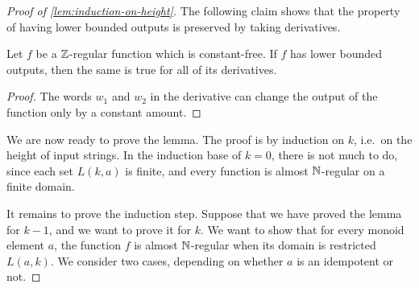 \begin{proof}[Proof of \cref{lem:induction-on-height}]
The following claim shows that the property of having lower bounded outputs is preserved by taking derivatives.

\begin{claim}\label{claim:derivative-lower-bounded}
    Let $f$ be a ${\mathbb Z}$-regular function which is constant-free. If $f$ has lower bounded outputs, then the same is true for all of its derivatives.
\end{claim}
\begin{proof}
    The words $w_1$ and $w_2$ in the derivative can change the output of the function only by a constant amount.
\end{proof}




We are now ready to prove the lemma. The proof is by induction on $k$, i.e.~on the height of input strings. In the induction base of $k=0$, there is not much  to do, since each set $L(k,a)$ is finite, and every function is almost ${\mathbb N}$-regular on a finite domain. 

It remains to prove the induction step. 
Suppose that we have proved the lemma for  $k-1$, and we want to prove it for $k$.  We want to show that for every monoid element $a$, the function $f$ is almost ${\mathbb N}$-regular when its domain is restricted $L(a,k)$. We consider two cases, depending on whether $a$ is an idempotent or not.



\end{proof}
